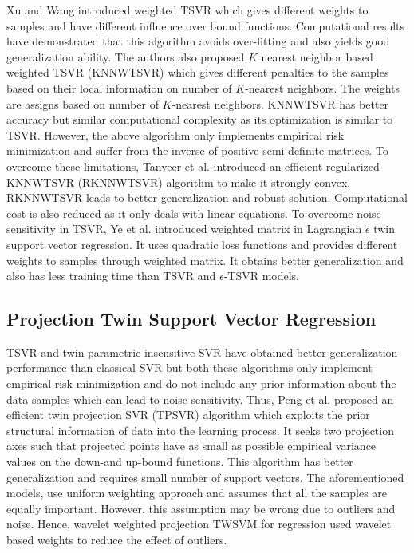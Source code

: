 \documentclass[pdflatex,sn-mathphys]{sn-jnl}%
\theoremstyle{thmstyleone}%
\theoremstyle{thmstyletwo}%
\theoremstyle{thmstylethree}%
\begin{document}
Xu and Wang \cite{xu2012weighted} introduced weighted TSVR which gives different weights to samples and have different influence over bound functions. Computational results have demonstrated that this algorithm avoids over-fitting and also yields good generalization ability. The authors \cite{xu2014k} also proposed $K$ nearest neighbor based weighted TSVR (KNNWTSVR) which gives different penalties to the samples based on their local information on number of $K$-nearest neighbors. The weights are assigns based on number of $K$-nearest neighbors. KNNWTSVR has better accuracy but similar computational complexity as its optimization is similar to TSVR. However, the above algorithm only implements empirical risk minimization and suffer from the inverse of positive semi-definite matrices. To overcome these limitations, Tanveer et al. \cite{tanveer2016efficient} introduced an efficient regularized KNNWTSVR (RKNNWTSVR) algorithm to make it strongly convex. RKNNWTSVR leads to better generalization and robust solution. Computational cost is also reduced as it only deals with linear equations. To overcome noise sensitivity in TSVR, Ye et al. \cite{ye2016weighted} introduced weighted matrix in Lagrangian $\epsilon$ twin support vector regression. It uses quadratic loss functions and provides different weights to samples through weighted matrix. It obtains better generalization and also has less training time than TSVR and $\epsilon$-TSVR models. 


\subsection{Projection Twin Support Vector Regression}

TSVR \cite{peng2010tsvr} and twin parametric insensitive SVR \cite{peng2012efficient} have obtained better generalization performance than classical SVR but both these algorithms only implement empirical risk minimization and do not include any prior information about the data samples which can lead to noise sensitivity. Thus, Peng et al. \cite{peng2014twin} proposed an efficient twin projection SVR (TPSVR) algorithm which exploits the prior structural information of data into the learning process. It seeks two projection axes such that projected points have as small as possible empirical variance values on the down-and up-bound functions. This algorithm has better generalization and requires small number of support vectors.  The aforementioned models, use uniform weighting approach and assumes that all the samples are equally important. However, this assumption may be wrong due to outliers and noise. Hence, wavelet weighted projection TWSVM for regression \cite{wang2019projection,wang2021projection} used wavelet based weights to reduce the effect of outliers. 
\end{document}
